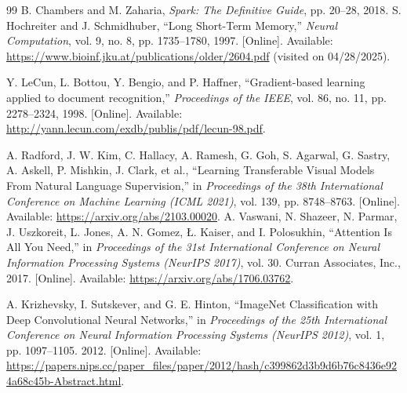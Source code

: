 \documentclass[../main.tex]{subfiles}
\begin{document}
\begin{thebibliography}{99}
 B. Chambers and M. Zaharia, \textit{Spark: The Definitive Guide}, pp. 20–28, 2018.
 S. Hochreiter and J. Schmidhuber, ``Long Short-Term Memory,'' \textit{Neural Computation}, vol. 9, no. 8, pp. 1735–1780, 1997. [Online]. Available: \url{https://www.bioinf.jku.at/publications/older/2604.pdf} (visited on 04/28/2025).

 Y. LeCun, L. Bottou, Y. Bengio, and P. Haffner, ``Gradient-based learning applied to document recognition,'' \textit{Proceedings of the IEEE}, vol. 86, no. 11, pp. 2278–2324, 1998. [Online]. Available: \url{http://yann.lecun.com/exdb/publis/pdf/lecun-98.pdf}.

 A. Radford, J. W. Kim, C. Hallacy, A. Ramesh, G. Goh, S. Agarwal, G. Sastry, A. Askell, P. Mishkin, J. Clark, et al., ``Learning Transferable Visual Models From Natural Language Supervision,'' in \textit{Proceedings of the 38th International Conference on Machine Learning (ICML 2021)}, vol. 139, pp. 8748–8763. [Online]. Available: \url{https://arxiv.org/abs/2103.00020}.
 A. Vaswani, N. Shazeer, N. Parmar, J. Uszkoreit, L. Jones, A. N. Gomez, Ł. Kaiser, and I. Polosukhin, ``Attention Is All You Need,'' in \textit{Proceedings of the 31st International Conference on Neural Information Processing Systems (NeurIPS 2017)}, vol. 30. Curran Associates, Inc., 2017. [Online]. Available: \url{https://arxiv.org/abs/1706.03762}.

 A. Krizhevsky, I. Sutskever, and G. E. Hinton, ``ImageNet Classification with Deep Convolutional Neural Networks,'' in \textit{Proceedings of the 25th International Conference on Neural Information Processing Systems (NeurIPS 2012)}, vol. 1, pp. 1097–1105. 2012. [Online]. Available: \url{https://papers.nips.cc/paper_files/paper/2012/hash/c399862d3b9d6b76c8436e924a68c45b-Abstract.html}.

\end{thebibliography}
\end{document}

